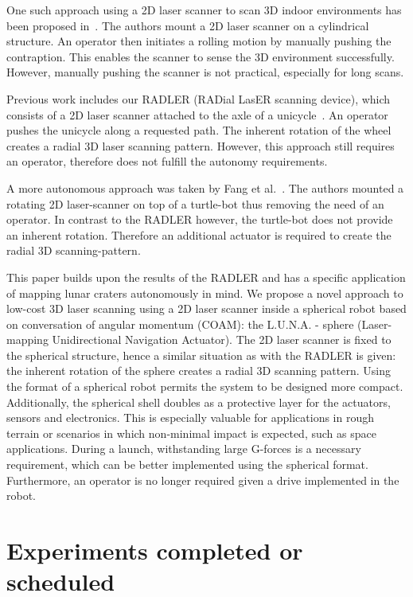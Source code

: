 \documentclass[graybox]{svmono}
\newcommand{\1}{\mathbbm{1}}                 %
\begin{document}
One such approach using a 2D laser scanner to scan 3D indoor environments has been proposed in~\cite{classical_mechanics_scanner}.
The authors mount a 2D laser scanner on a cylindrical structure.
An operator then initiates a rolling motion by manually pushing the contraption.
This enables the scanner to sense the 3D environment successfully.
However, manually pushing the scanner is not practical, especially for long scans.

Previous work includes our RADLER (RADial LasER scanning device), which consists of a 2D laser scanner attached to the axle of a unicycle~\cite{ISER2018}.
An operator pushes the unicycle along a requested path.
The inherent rotation of the wheel creates a radial 3D laser scanning pattern.
However, this approach still requires an operator, therefore does not fulfill the autonomy requirements. 

A more autonomous approach was taken by Fang et al.~\cite{3D_per_2D_based}.
The authors mounted a rotating 2D laser-scanner on top of a turtle-bot thus removing the need of an operator.
In contrast to the RADLER however, the turtle-bot does not provide an inherent rotation.
Therefore an additional actuator is required to create the radial 3D scanning-pattern. 

This paper builds upon the results of the RADLER and has a specific application of mapping lunar craters autonomously in mind.
We propose a novel approach to low-cost 3D laser scanning using a 2D laser scanner inside a spherical robot based on conversation of angular momentum (COAM): the L.U.N.A. - sphere (Laser-mapping Unidirectional Navigation Actuator).
The 2D laser scanner is fixed to the spherical structure, hence a similar situation as with the RADLER is given: the inherent rotation of the sphere creates a radial 3D scanning pattern.
Using the format of a spherical robot permits the system to be designed more compact. 
Additionally, the spherical shell doubles as a protective layer for the actuators, sensors and electronics. 
This is especially valuable for applications in rough terrain or scenarios in which non-minimal impact is expected, such as space applications.
During a launch, withstanding large G-forces is a necessary requirement, which can be better implemented using the spherical format. 
Furthermore, an operator is no longer required given a drive implemented in the robot.
\newpage


\newpage

\newpage
\section{Experiments completed or scheduled}
\end{document}
